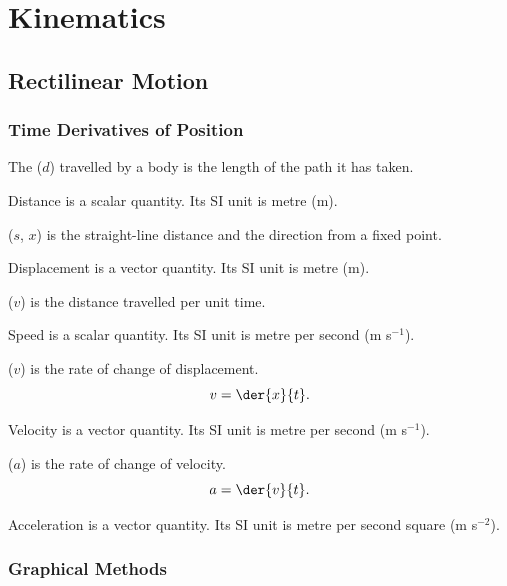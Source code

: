 \chapter{Kinematics}

\section{Rectilinear Motion}

\subsection{Time Derivatives of Position}

\begin{definition}
    The  ($d$) travelled by a body is the length of the path it has taken.
\end{definition}

Distance is a scalar quantity. Its SI unit is metre (m).

\begin{definition}
     ($s$, $x$) is the straight-line distance and the direction from a fixed point.
\end{definition}

Displacement is a vector quantity. Its SI unit is metre (m).

\begin{definition}
     ($v$) is the distance travelled per unit time.
\end{definition}

Speed is a scalar quantity. Its SI unit is metre per second (m s$^{-1}$).

\begin{definition}
     ($v$) is the rate of change of displacement. \[v = \der{x}{t}.\]
\end{definition}

Velocity is a vector quantity. Its SI unit is metre per second (m s$^{-1}$).

\begin{definition}
     ($a$) is the rate of change of velocity. \[a = \der{v}{t}.\]
\end{definition}

Acceleration is a vector quantity. Its SI unit is metre per second square (m s$^{-2}$).

\subsection{Graphical Methods}


